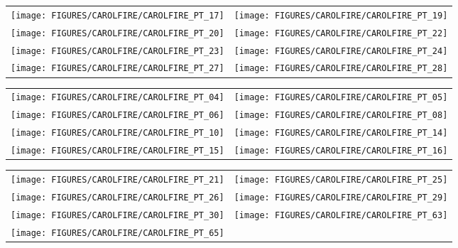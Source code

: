 \begin{figure}[p]
\begin{tabular*}{\textwidth}{l@{\extracolsep{\fill}}r}
\texttt{[image: FIGURES/CAROLFIRE/CAROLFIRE\_PT\_17]} &
\texttt{[image: FIGURES/CAROLFIRE/CAROLFIRE\_PT\_19]} \\
\texttt{[image: FIGURES/CAROLFIRE/CAROLFIRE\_PT\_20]} &
\texttt{[image: FIGURES/CAROLFIRE/CAROLFIRE\_PT\_22]} \\
\texttt{[image: FIGURES/CAROLFIRE/CAROLFIRE\_PT\_23]} &
\texttt{[image: FIGURES/CAROLFIRE/CAROLFIRE\_PT\_24]} \\
\texttt{[image: FIGURES/CAROLFIRE/CAROLFIRE\_PT\_27]} &
\texttt{[image: FIGURES/CAROLFIRE/CAROLFIRE\_PT\_28]}
\end{tabular*}
\label{CAROLFIRE_Thermoset_2}
\end{figure}

\begin{figure}[p]
\begin{tabular*}{\textwidth}{l@{\extracolsep{\fill}}r}
\texttt{[image: FIGURES/CAROLFIRE/CAROLFIRE\_PT\_04]} &
\texttt{[image: FIGURES/CAROLFIRE/CAROLFIRE\_PT\_05]} \\
\texttt{[image: FIGURES/CAROLFIRE/CAROLFIRE\_PT\_06]} &
\texttt{[image: FIGURES/CAROLFIRE/CAROLFIRE\_PT\_08]} \\
\texttt{[image: FIGURES/CAROLFIRE/CAROLFIRE\_PT\_10]} &
\texttt{[image: FIGURES/CAROLFIRE/CAROLFIRE\_PT\_14]} \\
\texttt{[image: FIGURES/CAROLFIRE/CAROLFIRE\_PT\_15]} &
\texttt{[image: FIGURES/CAROLFIRE/CAROLFIRE\_PT\_16]}
\end{tabular*}
\label{CAROLFIRE_Thermoplastic_1}
\end{figure}

\begin{figure}[p]
\begin{tabular*}{\textwidth}{l@{\extracolsep{\fill}}r}
\texttt{[image: FIGURES/CAROLFIRE/CAROLFIRE\_PT\_21]} &
\texttt{[image: FIGURES/CAROLFIRE/CAROLFIRE\_PT\_25]} \\
\texttt{[image: FIGURES/CAROLFIRE/CAROLFIRE\_PT\_26]} &
\texttt{[image: FIGURES/CAROLFIRE/CAROLFIRE\_PT\_29]} \\
\texttt{[image: FIGURES/CAROLFIRE/CAROLFIRE\_PT\_30]} &
\texttt{[image: FIGURES/CAROLFIRE/CAROLFIRE\_PT\_63]} \\
\texttt{[image: FIGURES/CAROLFIRE/CAROLFIRE\_PT\_65]} &
\end{tabular*}
\label{CAROLFIRE_Thermoplastic_2}
\end{figure}

